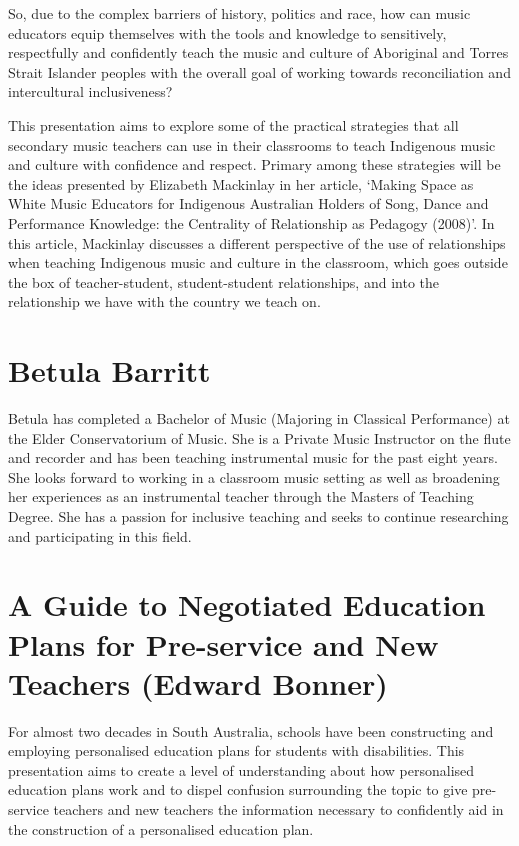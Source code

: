 \documentclass[twoside,12pt,a4paper,notitlepage]{memoir}
\begin{document}
So, due to the complex barriers of history, politics and race, how can music educators equip themselves with the tools and knowledge to sensitively, respectfully and confidently teach the music and culture of Aboriginal and Torres Strait Islander peoples with the overall goal of working towards reconciliation and intercultural inclusiveness?

This presentation aims to explore some of the practical strategies that all secondary music teachers can use in their classrooms to teach Indigenous music and culture with confidence and respect. Primary among these strategies will be the ideas presented by Elizabeth Mackinlay in her article, ‘Making Space as White Music Educators for Indigenous Australian Holders of Song, Dance and Performance Knowledge: the Centrality of Relationship as Pedagogy (2008)’. In this article, Mackinlay discusses a different perspective of the use of relationships when teaching Indigenous music and culture in the classroom, which goes outside the box of teacher-student, student-student relationships, and into the relationship we have with the country we teach on.


\section*{Betula Barritt}

Betula has completed a Bachelor of Music (Majoring in Classical Performance) at the Elder Conservatorium of Music. She is a Private Music Instructor on the flute and recorder and has been teaching instrumental music for the past eight years. She looks forward to working in a classroom music setting as well as broadening her experiences as an instrumental teacher through the Masters of Teaching Degree. She has a passion for inclusive teaching and seeks to continue researching and participating in this field.



\pagebreak
\section*{A Guide to Negotiated Education Plans for Pre-service and New Teachers (Edward Bonner)}
\label{aut:bonner}

For almost two decades in South Australia, schools have been constructing and employing personalised education plans for students with disabilities. This presentation aims to create a level of understanding about how personalised education plans work and to dispel confusion surrounding the topic to give pre-service teachers and new teachers the information necessary to confidently aid in the construction of a personalised education plan. 
\end{document}
